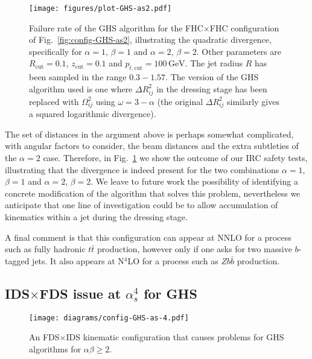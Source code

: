 \documentclass[nofootinbib,twocolumn,preprintnumbers,superscriptaddress,aps]{revtex4-2}
\newcommand{\as}{\alpha_s}
\newcommand{\GeV}{\,\text{GeV}}
\begin{document}
\begin{figure}
  \centering
  \texttt{[image: figures/plot-GHS-as2.pdf]}
  \caption{Failure rate of the GHS algorithm for the FHC$\times$FHC
    configuration of Fig.~\ref{fig:config-GHS-as2}, illustrating the
    quadratic divergence, specifically for $\alpha=1$, $\beta=1$ and
    $\alpha=2$, $\beta=2$.
    Other parameters are $R_\text{cut}=0.1$,
    $z_\text{cut}=0.1$ and $p_{t,\text{cut}}=100\GeV$.
    The jet radius $R$ has been sampled in the range $0.3{-}1.57$.
    The version of the GHS algorithm used is one where $\Delta
    R_{ij}^2$ in the dressing stage has been replaced with
    $\Omega_{ij}^2$ using $\omega = 3-\alpha$ (the original $\Delta
    R_{ij}^2$ similarly gives a squared logarithmic divergence). 
  }
  \label{fig:GHS-4hard-as2-rate}
\end{figure}


The set of distances in the argument above is perhaps somewhat
complicated, with angular factors to consider, the beam distances and
the extra subtleties of the $\alpha=2$ case.
%
Therefore, in Fig.~\ref{fig:GHS-4hard-as2-rate} we show the outcome of
our IRC safety tests, illustrating that the divergence is indeed
present for the two combinations $\alpha=1$, $\beta=1$ and
$\alpha=2$, $\beta=2$.
%
We leave to future work the possibility of identifying a concrete
modification of the algorithm that solves this problem, nevertheless
we anticipate that one line of investigation could be to allow
accumulation of kinematics within a jet during the dressing stage.

A final comment is that this configuration can appear at NNLO for a
process such as fully hadronic $t\bar t$ production, however only if
one asks for two massive $b$-tagged jets.
%
It also appears at N$^4$LO for a process such as $Zb\bar b$ production.


\subsection{IDS$\times$FDS issue at $\as^4$ for GHS}
\label{sec:GHS-trouble-as4}

\begin{figure}
  \centering
  \texttt{[image: diagrams/config-GHS-as-4.pdf]}
  \caption{ An FDS$\times$IDS kinematic configuration that causes problems for GHS
    algorithms for $\alpha\beta \ge 2$. }
  \label{fig:GHStrouble}
\end{figure}
\end{document}
